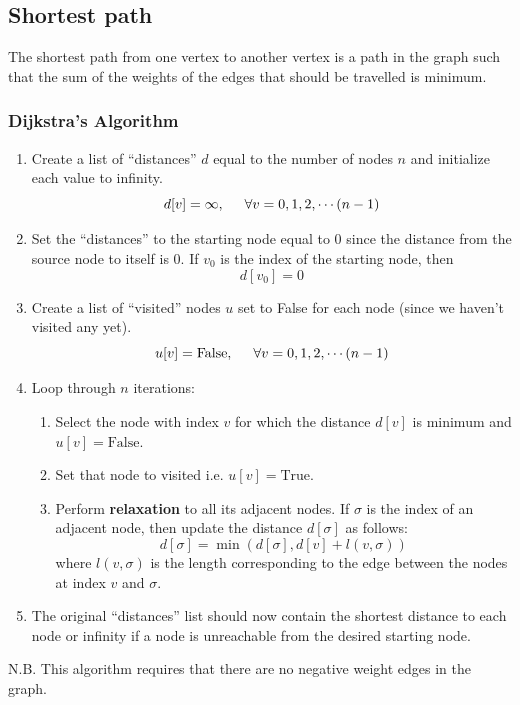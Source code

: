 \documentclass[a4paper,11pt]{book}
\begin{document}
\subsection{Shortest path}

\noindent The shortest path from one vertex to another vertex is a path in the graph such that the sum of the weights of the edges that should be travelled is minimum.

\subsubsection{Dijkstra's Algorithm}

\begin{enumerate}
    \item Create a list of ``distances'' $d$ equal to the number of nodes $n$ and initialize each value to infinity.
    $$d[v] = \infty, \hspace{5mm}\forall v = 0,1,2,\cdots (n-1)$$
    \item Set the ``distances'' to the starting node equal to 0 since the distance from the source node to itself is 0. If $v_0$ is the index of the starting node, then
    $$d[v_0] = 0$$
    \item Create a list of ``visited'' nodes $u$ set to False for each node (since we haven't visited any yet).
    $$u[v] = \text{False}, \hspace{5mm}\forall v = 0,1,2,\cdots (n-1)$$
    \item Loop through $n$ iterations:
    \begin{enumerate}
        \item Select the node with index $v$ for which the distance $d[v]$ is minimum and $u[v] = \text{False}$.
        \item Set that node to visited i.e. $u[v] = \text{True}$.
        \item Perform \textbf{relaxation} to all its adjacent nodes. If $\sigma$ is the index of an adjacent node, then update the distance $d[\sigma]$ as follows:
        $$d[\sigma] = \min\left(d[\sigma], d[v] + l(v,\sigma)\right)$$
        where $l(v,\sigma)$ is the length corresponding to the edge between the nodes at index $v$ and $\sigma$.
    \end{enumerate}
    \item The original ``distances'' list should now contain the shortest distance to each node or infinity if a node is unreachable from the desired starting node.
\end{enumerate}
\noindent N.B. This algorithm requires that there are no negative weight edges in the graph.
\vspace{5mm}
\end{document}
